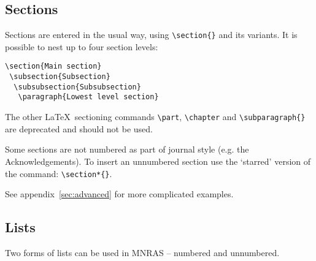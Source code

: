 \documentclass[fleqn,usenatbib,useAMS]{mnras}
\begin{document}
\subsection{Sections}
\label{sec:sections}
Sections are entered in the usual way, using \verb'\section{}' and its variants. It is possible to nest up to four section levels:
\begin{verbatim}
\section{Main section}
 \subsection{Subsection}
  \subsubsection{Subsubsection}
   \paragraph{Lowest level section}
\end{verbatim}
\noindent The other \LaTeX\ sectioning commands \verb'\part', \verb'\chapter' and \verb'\subparagraph{}' are deprecated and should not be used.

Some sections are not numbered as part of journal style (e.g. the Acknowledgements).
To insert an unnumbered section use the `starred' version of the command: \verb'\section*{}'.

See appendix~\ref{sec:advanced} for more complicated examples.

\subsection{Lists}

Two forms of lists can be used in MNRAS -- numbered and unnumbered.
\end{document}
